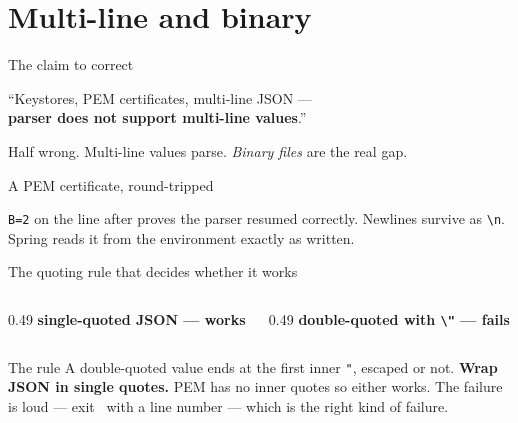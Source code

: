 \documentclass[aspectratio=169,10pt]{beamer}
\begin{document}
\section{Multi-line and binary}

\begin{frame}{The claim to correct}
  \begin{center}\Large
  ``Keystores, PEM certificates, multi-line JSON --- \\
  \textbf{parser does not support multi-line values}.''
  \end{center}

  \vspace{1.0em}
  \begin{center}\large
  Half wrong. Multi-line values parse. \emph{Binary files} are the real gap.
  \end{center}

  \vspace{0.8em}
\end{frame}

\begin{frame}[fragile]{A PEM certificate, round-tripped}

  \vspace{0.4em}
  {\footnotesize \texttt{B=2} on the line after proves the parser resumed
  correctly. Newlines survive as \texttt{\textbackslash n}. Spring reads it
  from the environment exactly as written.}
\end{frame}

\begin{frame}[fragile]{The quoting rule that decides whether it works}
  \begin{columns}[T]
    \begin{column}{0.49\textwidth}
      \centering\footnotesize\textbf{single-quoted JSON --- works}
    \end{column}
    \begin{column}{0.49\textwidth}
      \centering\footnotesize\textbf{double-quoted with \texttt{\textbackslash "} --- fails}
    \end{column}
  \end{columns}

  \vspace{0.6em}
  \begin{block}{The rule}
    A double-quoted value ends at the first inner \texttt{"}, escaped or not.
    \textbf{Wrap JSON in single quotes.} PEM has no inner quotes so either
    works. The failure is loud --- exit \exittwo\ with a line number --- which
    is the right kind of failure.
  \end{block}
\end{frame}
\end{document}
